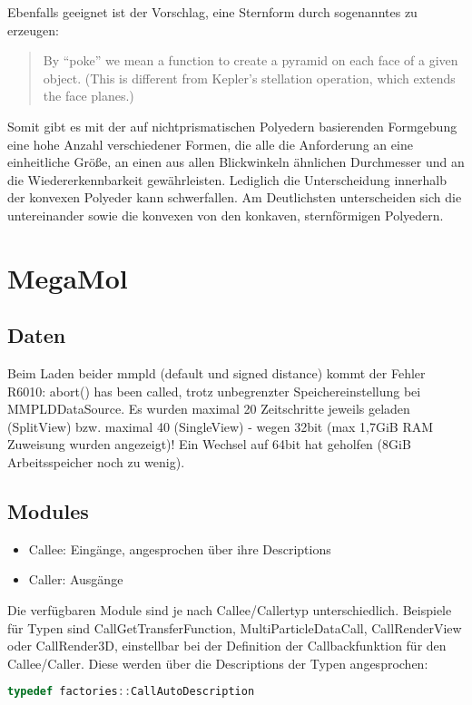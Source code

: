 Ebenfalls geeignet ist der Vorschlag, eine Sternform durch sogenanntes  zu erzeugen: \blockcquote[4]{ProceduralGenerationofSculpturalForms}{By “poke” we mean a function to create a pyramid on each face of a given object. (This is different from Kepler’s stellation operation, which extends the face planes.)}

Somit gibt es mit der auf nichtprismatischen Polyedern basierenden Formgebung eine hohe Anzahl verschiedener Formen, die alle die Anforderung an eine einheitliche Größe, an einen aus allen Blickwinkeln ähnlichen Durchmesser und an die Wiedererkennbarkeit gewährleisten. Lediglich die Unterscheidung innerhalb der konvexen Polyeder kann schwerfallen. Am Deutlichsten unterscheiden sich die  untereinander sowie die konvexen von den konkaven, sternförmigen Polyedern.

\chapter{MegaMol}

\section{Daten}
Beim Laden beider mmpld (default und signed distance) kommt der Fehler R6010: abort() has been called, trotz unbegrenzter Speichereinstellung bei MMPLDDataSource. Es wurden maximal 20 Zeitschritte jeweils geladen (SplitView) bzw. maximal 40 (SingleView) - wegen 32bit (max 1,7GiB RAM Zuweisung wurden angezeigt)! Ein Wechsel auf 64bit hat geholfen (8GiB Arbeitsspeicher noch zu wenig).

\section{Modules}
\begin{itemize}
\item Callee: Eingänge, angesprochen über ihre Descriptions
\item Caller: Ausgänge
\end{itemize}

Die verfügbaren Module sind je nach Callee/Callertyp unterschiedlich. Beispiele für Typen sind CallGetTransferFunction, MultiParticleDataCall, CallRenderView oder CallRender3D, einstellbar bei der Definition der Callbackfunktion für den Callee/Caller. Diese werden über die Descriptions der Typen angesprochen:
\begin{lstlisting}[language=c]
typedef factories::CallAutoDescription
\end{lstlisting}

